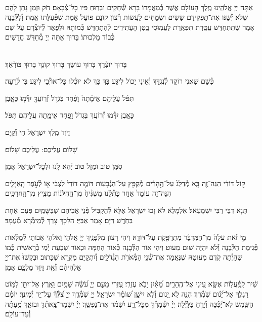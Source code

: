 \documentclass[twoside, openany, parskip=half, 11pt]{book}
\begin{document}
\\
אַתָּה יְיָ אֱלֹהֵֽינוּ מֶֽלֶךְ הָעוֹלָם אֲשֶׁר בְּ֯מַאֲמָרוֹ בָּרָא שְׁ֯חָקִים וּבְרֽוּחַ פִּיו כׇּל־צְ֯בָאָם׃ חֹק וּזְמַן נָתַן לָהֶם שֶׁלֹּא יְ֯שַׁנּוּ אֶת־תַּפְקִידָם׃ שָׂשִׂים וּשְׂמֵחִים לַעֲשׂוֹת רְ֯צוֹן קוֹנָם פּוֹעֵל אֱמֶת שֶׁפְּ֯עֻלָּתוֹ אֱמֶת׃ וְ֯לַלְּ֯בָנָה אָמַר שֶׁתִּתְחַדֵּשׁ עֲטֶֽרֶת תִּפְאֶֽרֶת לַעֲמֽוּסֵי בָֽטֶן הָעֲתִידִים לְ֯הִתְחַדֵּשׁ כְּ֯מוֹתָהּ וּלְפָאֵר לְ֯יוֹצְ֯רָם עַל שֵׁם כְּ֯בוֹד מַלְכוּתוֹ׃ בָּרוּךְ אַתָּה יְיָ מְ֯חַדֵּשׁ חֳדָשִׁים׃

\\
בָּרוּךְ יוֹצְ֯רֵךְ בָּרוּךְ עוֹשֵׂךְ בָּרוּךְ קוֹנֵךְ בָּרוּךְ בּוֹרְ֯אֵךְ׃

כְּ֯שֵׁם שֶׁאֲנִי רוֹקֵד לְ֯נֶגְדֵּךְ וְ֯אֵינִי יָכוֹל לִיגַּע בָּךְ
כַּךְ לֹא יוּכְ֯לוּ כׇּל־אוֹיְ֯בַי לִיגַּע בִּי לְ֯רָעָה׃

תִּפֹּ֨ל עֲלֵיהֶ֤ם אֵימָ֨תָה֙ וָפַ֔חַד בִּגְדֹ֥ל זְ֯רֽוֹעֲךָ֖ יִדְּ֯מ֣וּ כָּאָ֑בֶן׃


כָּאָֽבֶן יִדְּ֯מוּ זְ֯רוֹעֲךָ בִּגְדֹל וָפַֽחַד אֵימָֽתָה עֲלֵיהֶם תִּפֹּל׃


דָּוִד מֶֽלֶךְ יִשְׂרָאֵל חַי וְ֯קַיָּם׃

שָׁלוֹם עֲלֵיכֶם: \qquad {}
עֲלֵיכֶם שָׁלוֹם׃


סִמָּן טוֹב וּמַזָּל טוֹב יְ֯הֵא לָֽנוּ וּלְכׇל־יִשְׂרָאֵל אָמֵן׃

ק֣וֹל דּוֹדִ֔י הִנֵּה־זֶ֖ה בָּ֑א מְ֯דַלֵּג֙ עַל־הֶ֣הָרִ֔ים מְ֯קַפֵּ֖ץ עַל־הַגְּ֯בָעֽוֹת׃ דּוֹמֶ֤ה דוֹדִי֙ לִצְבִ֔י א֖וֹ לְ֯עֹ֣פֶר הָֽאַיָּלִ֑ים הִנֵּה־זֶ֤ה עוֹמֵד֙ אַחַ֣ר כָּתְ֯לֵ֔נוּ מַשְׁגִּ֨יחַ֙ מִן־הַֽחֲלֹּנ֔וֹת מֵצִ֖יץ מִן־הַֽחֲרַכִּֽים׃

תָּנָא דִבֵּי רַבִּי יִשְׁמָעֵאל׃ אִלְמָלֵא לֹא זָכוּ יִשְׂרָאֵל אֶלָּא לְ֯הַקְבִּיל פְּ֯נֵי אֲבִיהֶם שֶׁבַּשָּׁמַֽיִם פַּעַם אֶחָת בַּחֹֽדֶשׁ דַּיָּם׃ אָמַר אַבַּיֵּי׃ הִלְכָּךְ צָרֵךְ לְ֯מֵימְ֯רָא מְ֯עֻמָּד׃

מִ֣י זֹ֗את עֹלָה֙ מִן־הַמִּדְבָּ֔ר מִתְרַפֶּ֖קֶת עַל־דּוֹדָ֑הּ׃
וִיהִי רָצוֹן מִלְּ֯פָנֶֽיךָ יְיָ אֱלֹהַי וֵאלֹהֵי אֲבוֹתַי לְ֯מַלְּ֯אוֹת פְּ֯גִימַת הַלְּ֯בָנָה וְ֯לֹא יִהְיֶה שׁוּם מִעוּט׃ וִיהִי אוֹר הַלְּ֯בָנָה כְּ֯אוֹר הַחַמָּה וּכְאוֹר שִׁבְעַת יְ֯מֵי בְ֯רֵאשִׁית כְּ֯מוֹ שֶׁהָיְ֯תָה קֹֽדֶם מִעוּטָהּ שֶׁנֶּאֱמַר׃
אֶת־שְׁ֯נֵ֥י הַמְּ֯אֹרֹ֖ת הַגְּ֯דֹלִ֑ים וְ֯יִתְקַיַּם מִקְרָא שֶׁכָּתוּב׃ וּבִקְשׁוּ֙ אֶת־יְיָ֣ אֱלֹֽהֵיהֶ֔ם וְ֯אֵ֖ת דָּוִ֣ד מַלְכָּ֑ם אָמֵן׃


שִׁ֗יר לַֽמַּֽ֫עֲל֥וֹת אֶשָּׂ֣א עֵ֭ינַי אֶל־הֶֽהָרִ֑ים מֵ֝אַ֗יִן יָבֹ֥א עֶזְרִֽי׃ עֶ֭זְרִי מֵעִ֣ם יְיָ֑ עֹ֝שֵׂ֗ה שָׁמַ֥יִם וָאָֽרֶץ׃ אַל־יִתֵּ֣ן לַמּ֣וֹט רַגְלֶ֑ךָ אַל־יָ֝נ֗וּם שֹֽׁמְ֯רֶֽךָ׃ הִנֵּ֤ה לֹ֣א יָ֭נוּם וְ֯לֹ֣א יִישָׁ֑ן שׁ֝וֹמֵ֗ר יִשְׂרָאֵֽל׃ יְיָ֥ שֹֽׁמְ֯רֶ֑ךָ יְיָ֥ צִ֝לְּ֯ךָ֗ עַל־יַ֥ד יְ֯מִינֶֽךָ׃ יוֹמָ֗ם הַשֶּׁ֥מֶשׁ לֹֽא־יַ֝כֶּ֗כָּה וְ֯יָרֵ֥חַ בַּלָּֽיְ֯לָה׃ יְיָ֗ יִשְׁ֯מָרְ֯ךָ֥ מִכׇּל־רָ֑ע יִ֝שְׁמֹ֗ר אֶת־נַפְשֶֽׁךָ׃ יְיָ֗ יִשְׁמָר־צֵֽאתְ֯ךָ֥ וּבוֹאֶ֑ךָ מֵֽ֝עַתָּ֗ה וְ֯עַד־עוֹלָֽם׃
\end{document}
